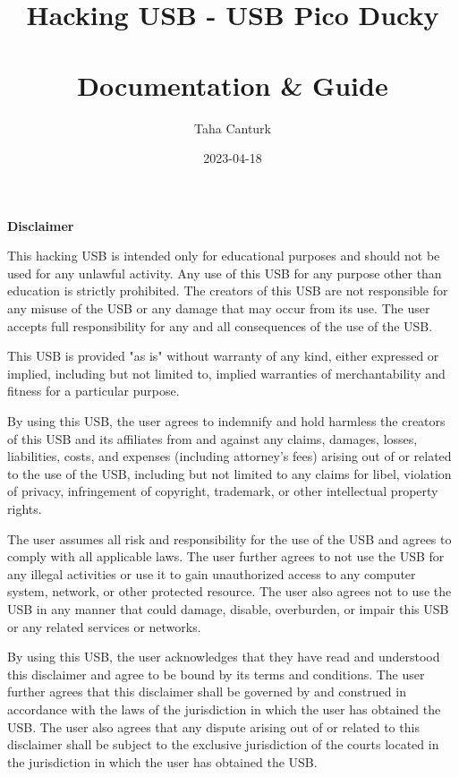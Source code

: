 \documentclass[a4paper,12pt]{article}
\title{
	\Huge Hacking USB - USB Pico Ducky\\
	\ \\
	\Large Documentation \& Guide
}
\author{Taha Canturk}
\date{2023-04-18}
\begin{document}
\maketitle

\newpage

\begin{titlepage}
\end{titlepage}

\textbf{Disclaimer}

\vspace{0.2in}

This hacking USB is intended only for educational purposes and should not be used for any unlawful activity. Any use of this USB for any purpose other than education is strictly prohibited. The creators of this USB are not responsible for any misuse of the USB or any damage that may occur from its use. The user accepts full responsibility for any and all consequences of the use of the USB.

This USB is provided "as is" without warranty of any kind, either expressed or implied, including but not limited to, implied warranties of merchantability and fitness for a particular purpose.

By using this USB, the user agrees to indemnify and hold harmless the creators of this USB and its affiliates from and against any claims, damages, losses, liabilities, costs, and expenses (including attorney's fees) arising out of or related to the use of the USB, including but not limited to any claims for libel, violation of privacy, infringement of copyright, trademark, or other intellectual property rights.

The user assumes all risk and responsibility for the use of the USB and agrees to comply with all applicable laws. The user further agrees to not use the USB for any illegal activities or use it to gain unauthorized access to any computer system, network, or other protected resource. The user also agrees not to use the USB in any manner that could damage, disable, overburden, or impair this USB or any related services or networks.

By using this USB, the user acknowledges that they have read and understood this disclaimer and agree to be bound by its terms and conditions. The user further agrees that this disclaimer shall be governed by and construed in accordance with the laws of the jurisdiction in which the user has obtained the USB. The user also agrees that any dispute arising out of or related to this disclaimer shall be subject to the exclusive jurisdiction of the courts located in the jurisdiction in which the user has obtained the USB.
\end{document}
